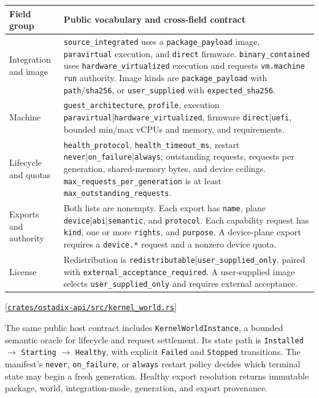\documentclass[11pt,oneside]{article}
\newcommand{\src}[1]{\textcolor{OSlate}{\scriptsize[\href{https://github.com/lostadi/OSTADIX/blob/c0b02c326b2329a95ba52447c7180bc93957cd57/#1}{\nolinkurl{#1}}]}\allowbreak}
\begin{document}
\begin{longtable}{P{0.20\textwidth} P{0.72\textwidth}}
\toprule
\textbf{Field group} & \textbf{Public vocabulary and cross-field contract} \\
\midrule
\endhead
Integration and image &
\texttt{source\_integrated} uses a \texttt{package\_payload} image,
\texttt{paravirtual} execution, and \texttt{direct} firmware.
\texttt{binary\_contained} uses \texttt{hardware\_virtualized} execution and
requests \texttt{vm.machine} \texttt{run} authority. Image kinds are
\texttt{package\_payload} with \texttt{path}/\texttt{sha256}, or
\texttt{user\_supplied} with \texttt{expected\_sha256}. \\
Machine &
\texttt{guest\_architecture}, \texttt{profile}, execution
\texttt{paravirtual}|\texttt{hardware\_virtualized}, firmware
\texttt{direct}|\texttt{uefi}, bounded min/max vCPUs and memory, and
requirements. \\
Lifecycle and quotas &
\texttt{health\_protocol}, \texttt{health\_timeout\_ms}, restart
\texttt{never}|\texttt{on\_failure}|\texttt{always}; outstanding requests,
requests per generation, shared-memory bytes, and device ceilings.
\texttt{max\_requests\_per\_generation} is at least
\texttt{max\_outstanding\_requests}. \\
Exports and authority &
Both lists are nonempty. Each export has \texttt{name}, plane
\texttt{device}|\texttt{abi}|\texttt{semantic}, and \texttt{protocol}. Each
capability request has \texttt{kind}, one or more \texttt{rights}, and
\texttt{purpose}. A device-plane export requires a \texttt{device.*} request
and a nonzero device quota. \\
License &
Redistribution is \texttt{redistributable}|\texttt{user\_supplied\_only},
paired with \texttt{external\_acceptance\_required}. A user-supplied image
selects \texttt{user\_supplied\_only} and requires external acceptance. \\
\bottomrule
\end{longtable}
\src{crates/ostadix-api/src/kernel_world.rs}

The same public host contract includes \texttt{KernelWorldInstance}, a bounded
semantic oracle for lifecycle and request settlement. Its state path is
\texttt{Installed} $\rightarrow$ \texttt{Starting} $\rightarrow$
\texttt{Healthy}, with explicit \texttt{Failed} and \texttt{Stopped}
transitions. The manifest's \texttt{never}, \texttt{on\_failure}, or
\texttt{always} restart policy decides which terminal state may begin a fresh
generation. Healthy export resolution returns immutable package, world,
integration-mode, generation, and export provenance.
\end{document}
